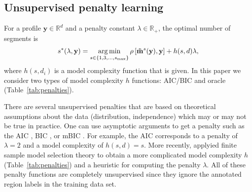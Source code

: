 \documentclass{article}
\DeclareMathOperator*{\argmin}{arg\,min}
\newcommand{\RR}{\mathbb R}
\begin{document}




\subsection{Unsupervised penalty learning}
\label{sec:unsupervised}


For a profile $\mathbf y\in\RR^d$ and a penalty constant $\lambda\in\RR_+$, the
optimal number of segments is
\begin{equation}
  \label{eq:optimal_segments}
  s^*(\lambda, \mathbf y) =
  \argmin_{s\in\{1,3,\dots, s_{\text{\text{max}}}\}}
  \rho\left[
    \mathbf{\tilde m}^s(\mathbf y),
    \mathbf y
  \right]
  + h(s, d) \lambda,
\end{equation}
where $h(s, d_i)$ is a model complexity function that is given. In
this paper we consider two types of model complexity $h$ functions:
AIC/BIC and oracle (Table~\ref{tab:penalties}). 

There are several unsupervised penalties that are based on theoretical
assumptions about the data (distribution, independence) which may or
may not be true in practice. One can use asymptotic arguments to get a
penalty such as the AIC \citep{Akaike73}, BIC \citep{Schwarz78}, or
mBIC \citep{mBIC}. For example, the AIC corresponds to a penalty of
$\lambda=2$ and a model complexity of $h(s, d)=s$. More recently,
\citet{cleynen2013segmentation} applyied finite sample model selection
theory to obtain a more complicated model complexity $h$
(Table~\ref{tab:penalties}) and a heuristic for computing the penalty
$\lambda$. All of these penalty functions are completely unsupervised
since they ignore the annotated region labels in the training data
set.
\end{document}
